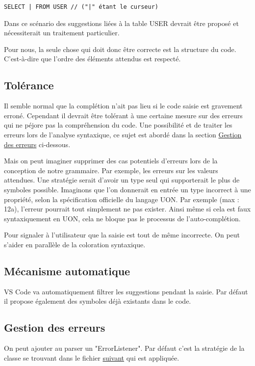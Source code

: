 \documentclass[
    iict, %
    il, %
]{heig-tb}
\begin{document}
\begin{lstlisting}[frame=single]
SELECT | FROM USER // ("|" étant le curseur)
\end{lstlisting}

Dans ce scénario des suggestions liées à la table USER devrait être proposé et nécessiterait un traitement particulier.

Pour nous, la seule chose qui doit donc être correcte est la structure du code. C'est-à-dire que l'ordre des éléments attendus est respecté.

\subsection{Tolérance}
Il semble normal que la complétion n'ait pas lieu si le code saisie est gravement erroné.
Cependant il devrait être tolérant à une certaine mesure sur des erreurs qui ne péjore pas la compréhension du code.
Une possibilité et de traiter les erreurs lors de l'analyse syntaxique, ce sujet est abordé dans la section \hyperref[error handle]{Gestion des erreurs} ci-dessous.

Mais on peut imaginer supprimer des cas potentiels d'erreurs lors de la conception de notre grammaire.
Par exemple, les erreurs sur les valeurs attendues. Une stratégie serait d'avoir un type seul qui supporterait le plus de symboles possible.
Imaginons que l'on donnerait en entrée un type incorrect à une propriété, selon la spécification officielle du langage UON.
Par exemple (max : 12a), l'erreur pourrait tout simplement ne pas exister.
Ainsi même si cela est faux syntaxiquement en UON, cela ne bloque pas le processus de l'auto-complétion.

Pour signaler à l'utilisateur que la saisie est tout de même incorrecte. On peut s'aider en parallèle de la coloration syntaxique.

\subsection{Mécanisme automatique}
VS Code va automatiquement filtrer les suggestions pendant la saisie.
Par défaut il propose également des symboles déjà existants dans le code.

\subsection{Gestion des erreurs}\label{error handle}
On peut ajouter au parser un "ErrorListener".
Par défaut c'est la stratégie de la classe se trouvant dans le fichier \href{https://github.com/tunnelvisionlabs/antlr4ts/blob/master/src/DefaultErrorStrategy.ts}{suivant} qui est appliquée.
\end{document}
